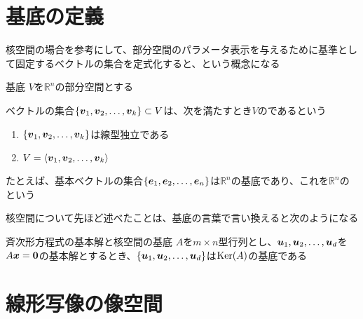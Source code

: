 \documentclass[../../../topic_linear-algebra]{subfiles}
\begin{document}
\sectionline
\section{基底の定義}

核空間の場合を参考にして、部分空間のパラメータ表示を与えるために基準として固定するベクトルの集合を定式化すると、という概念になる

\begin{definition}{基底}
  $V$を$\mathbb{R}^n$の部分空間とする

  ベクトルの集合$\{ \vb*{v}_1, \vb*{v}_2, \dots, \vb*{v}_k \} \subset V$は、次を満たすとき$V$のであるという
  \begin{enumerate}[label=\romanlabel]
    \item $\{ \vb*{v}_1, \vb*{v}_2, \dots, \vb*{v}_k \}$は線型独立である
    \item $V = \langle \vb*{v}_1, \vb*{v}_2, \dots, \vb*{v}_k \rangle$
  \end{enumerate}
\end{definition}

たとえば、基本ベクトルの集合$\{ \vb*{e}_1, \vb*{e}_2, \dots, \vb*{e}_n \}$は$\mathbb{R}^n$の基底であり、これを$\mathbb{R}^n$のという

\sectionline

核空間について先ほど述べたことは、基底の言葉で言い換えると次のようになる

\begin{theorem}{斉次形方程式の基本解と核空間の基底}
  $A$を$m \times n$型行列とし、$\vb*{u}_1, \vb*{u}_2, \dots, \vb*{u}_d$を$A\vb*{x} = \vb*{0}$の基本解とするとき、$\{ \vb*{u}_1, \vb*{u}_2, \dots, \vb*{u}_d \}$は$\operatorname{Ker}(A)$の基底である
\end{theorem}

\sectionline
\section{線形写像の像空間}

\end{document}
